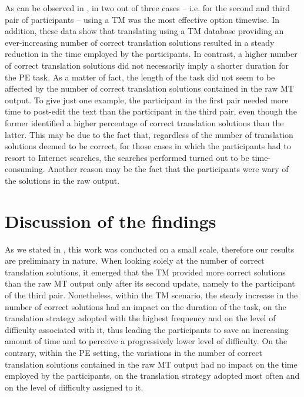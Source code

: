 \documentclass[output=paper]{LSP/langsci}
\begin{document}
As can be observed in , in two out of three cases -- i.e. for the second and third pair of participants -- using a TM was the most effective option timewise. In addition, these data show that translating using a TM database providing an ever-increasing number of correct translation solutions resulted in a steady reduction in the time employed by the participants. In contrast, a higher number of correct translation solutions did not necessarily imply a shorter duration for the PE task. As a matter of fact, the length of the task did not seem to be affected by the number of correct translation solutions contained in the raw MT output. To give just one example, the participant in the first pair needed more time to post-edit the text than the participant in the third pair, even though the former identified a higher percentage of correct translation solutions than the latter. This may be due to the fact that, regardless of the number of translation solutions deemed to be correct, for those cases in which the participants had to resort to Internet searches, the searches performed turned out to be time-consuming. Another reason may be the fact that the participants were wary of the solutions in the raw output. 

\section{Discussion of the findings}\label{ressetti-gaspari:sec:7}

\largerpage
As we stated in , this work was conducted on a small scale, therefore our results are preliminary in nature. When looking solely at the number of correct translation solutions, it emerged that the TM provided more correct solutions than the raw MT output only after its second update, namely to the participant of the third pair. Nonetheless, within the TM scenario, the steady increase in the number of correct solutions had an impact on the duration of the task, on the translation strategy adopted with the highest frequency and on the level of difficulty associated with it, thus leading the participants to save an increasing amount of time and to perceive a progressively lower level of difficulty. On the contrary, within the PE setting, the variations in the number of correct translation solutions contained in the raw MT output had no impact on the time employed by the participants, on the translation strategy adopted most often and on the level of difficulty assigned to it.
\end{document}

